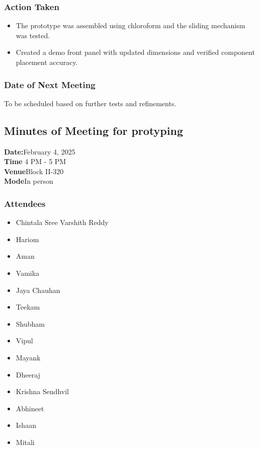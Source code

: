 \documentclass[12pt,a4paper]{article}
\begin{document}
\subsubsection*{Action Taken}
\begin{itemize}
    \item The prototype was assembled using chloroform and the sliding mechanism was tested.
    \item Created a demo front panel with updated dimensions and verified component placement accuracy.
\end{itemize}

\subsubsection*{Date of Next Meeting}
To be scheduled based on further tests and refinements.
\subsection*{Minutes of Meeting for protyping}

\textbf{Date:}February 4, 2025\\
\textbf{Time} 4 PM - 5 PM\\
\textbf{Venue}Block II-320 \\
\textbf{Mode}In person\\

\subsubsection*{Attendees}
\begin{itemize}
    \item Chintala Sree Varshith Reddy
    \item Hariom
    \item Aman
    \item Vamika
    \item Jaya Chauhan
    \item Teekam
    \item Shubham
    \item Vipul
    \item Mayank
    \item Dheeraj
    \item Krishna Sendhvil
    \item Abhineet
    \item Ishaan
    \item Mitali
\end{itemize}
\end{document}
